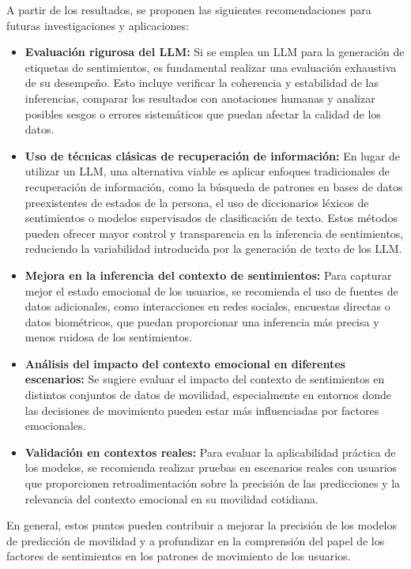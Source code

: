 \begin{recomendations}
    A partir de los resultados, se proponen las siguientes 
    recomendaciones para futuras investigaciones y aplicaciones:

\begin{itemize}
    \item \textbf{Evaluación rigurosa del LLM:} Si se emplea un LLM para 
    la generación de etiquetas de sentimientos, es fundamental realizar 
    una evaluación exhaustiva de su desempeño. Esto incluye verificar 
    la coherencia y estabilidad de las inferencias, comparar los 
    resultados con anotaciones humanas y analizar posibles sesgos o 
    errores sistemáticos que puedan afectar la calidad de los datos.
    
    \item \textbf{Uso de técnicas clásicas de recuperación de información:} 
    En lugar de utilizar un 
    LLM, una alternativa viable es aplicar enfoques tradicionales de 
    recuperación de información, como la búsqueda de patrones en 
    bases de datos preexistentes de estados de la persona, el uso de 
    diccionarios léxicos de sentimientos o modelos supervisados de 
    clasificación de texto. 
    Estos métodos pueden ofrecer mayor control y transparencia en 
    la inferencia de sentimientos, reduciendo la variabilidad 
    introducida por la generación de texto de los LLM.

   

    \item \textbf{Mejora en la inferencia del contexto de sentimientos:} 
    Para capturar mejor el estado emocional de los usuarios, se recomienda 
    el uso de fuentes de datos adicionales, como interacciones en redes 
    sociales, encuestas directas o datos biométricos, que puedan 
    proporcionar una inferencia más precisa y menos ruidosa de los 
    sentimientos.
    
    \item \textbf{Análisis del impacto del contexto emocional en 
    diferentes escenarios:} Se sugiere evaluar el impacto del contexto 
    de sentimientos en distintos conjuntos de datos de movilidad, 
    especialmente en entornos donde las decisiones de movimiento pueden 
    estar más influenciadas por factores emocionales.
    
    \item \textbf{Validación en contextos reales:} Para evaluar la 
    aplicabilidad práctica de los modelos, se recomienda realizar 
    pruebas en escenarios reales con usuarios que proporcionen 
    retroalimentación sobre la precisión de las predicciones y 
    la relevancia del contexto emocional en su movilidad cotidiana.
\end{itemize}

En general, estos puntos pueden contribuir a mejorar la precisión de 
los modelos de predicción de movilidad y a profundizar en la 
comprensión del papel de los factores de sentimientos en los patrones 
de movimiento de los usuarios.

\end{recomendations}
